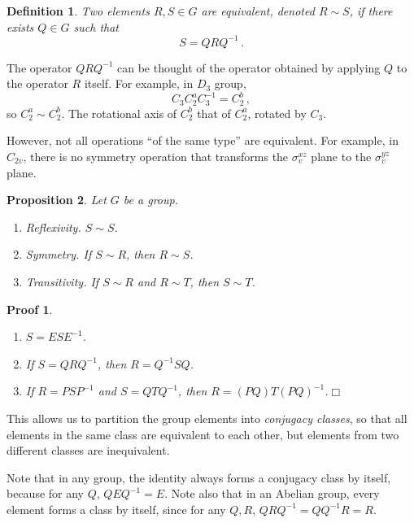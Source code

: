 \documentclass{article}
\theoremstyle{plain}\theoremheaderfont{\normalfont\itshape}\theorembodyfont{\rmfamily}\theoremseparator{.}\newtheorem*{rem}{Remark}\newtheorem*{ex}{Example}\newtheorem*{proof}{Proof}\newtheorem*{altp}{Alternative proof}
\theoremstyle{plain}\theoremheaderfont{\normalfont\bfseries}\theorembodyfont{\rmfamily}\theoremseparator{.}\newtheorem{thm}{Theorem}[section]\newtheorem{lem}[thm]{Lemma}\newtheorem{prop}[thm]{Proposition}\newtheorem*{cor}{Corollary}\newtheorem{defn}[thm]{Definition}\newtheorem{clm}[thm]{Claim}\newtheorem{clminproof}{Claim}\newtheorem*{law}{Law}\newtheorem{pos}[thm]{Postulate}
\theoremstyle{break}\theoremheaderfont{\normalfont\itshape}\theorembodyfont{\rmfamily}\theoremseparator{.\medskip}\newtheorem*{proofskip}{Proof}\newtheorem*{exs}{Examples}\newtheorem*{rems}{Remarks}
\theoremstyle{break}\theoremheaderfont{\normalfont\bfseries}\theorembodyfont{\rmfamily}\theoremseparator{.\medskip}\newtheorem{lemskip}[thm]{Lemma}\newtheorem{defnskip}[thm]{Definition}\newtheorem{propskip}[thm]{Proposition}\newtheorem{thmskip}[thm]{Theorem}
\numberwithin{equation}{section}
\newcommand{\qed}{\hfill\ensuremath{\Box}}
\begin{document}
    \begin{defn}
        Two elements \(R,S\in G\) are \textit{equivalent}, denoted \(R\sim S\), if there exists \(Q\in G\) such that
        \begin{equation}
            S=QRQ^{-1}\,.
        \end{equation}
    \end{defn}

    The operator \(QRQ^{-1}\) can be thought of the operator obtained by applying \(Q\) to the operator \(R\) itself. For example, in \(D_{3}\) group,
    \begin{equation}
        C_3C_2^a C_3^{-1}= C_2^b\,,
    \end{equation}
    so \(C_2^a\sim C_2^b\). The rotational axis of \(C_2^b\) that of \(C_2^a\), rotated by \(C_3\).

    However, not all operations ``of the same type'' are equivalent. For example, in \(C_{2v}\), there is no symmetry operation that transforms the \(\sigma_v^{xz}\) plane to the \(\sigma_v^{yz}\) plane.

    \begin{prop}
        Let \(G\) be a group.
        \begin{enumerate}[topsep=0pt,label=(\roman*)]
            \item \textit{Reflexivity}. \(S\sim S\).
            \item \textit{Symmetry}. If \(S\sim R\), then \(R\sim S\).
            \item \textit{Transitivity}. If \(S\sim R\) and \(R\sim T\), then \(S\sim T\).
        \end{enumerate}
    \end{prop}
    \begin{proofskip}
        \begin{enumerate}[topsep=0pt,label=(\roman*)]
            \item \(S=ESE^{-1}\).
            \item If \(S=QRQ^{-1}\), then \(R=Q^{-1}SQ\).
            \item If \(R=PSP^{-1}\) and \(S=QTQ^{-1}\), then \(R=(PQ)T(PQ)^{-1}\).\qed
        \end{enumerate}
    \end{proofskip}
    This allows us to partition the group elements into \textit{conjugacy classes}, so that all elements in the same class are equivalent to each other, but elements from two different classes are inequivalent.

    Note that in any group, the identity always forms a conjugacy class by itself, because for any \(Q\), \(QEQ^{-1}=E\). Note also that in an Abelian group, every element forms a class by itself, since for any \(Q,R\), \(QRQ^{-1}=QQ^{-1}R=R\).
\end{document}
